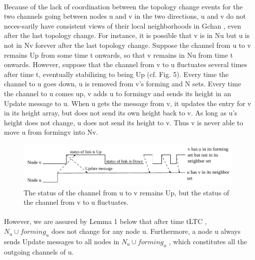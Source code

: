 \paragraph{}Because of the lack of coordination between the topology change events for the two channels going between nodes u and v in the two directions, u and v do not neces-sarily have consistent views of their local neighborhoods in Gchan , even after the last topology change. For instance, it is possible that v is in Nu but u is not in Nv forever after the last topology change. Suppose the channel from u to v remains Up from some time t onwards, so that v remains in Nu from time t onwards. However, suppose that the channel from v to u fluctuates several times after time t, eventually stabilizing to being Up (cf. Fig. 5). Every time the channel to u goes down, u is removed from v’s forming and N sets. Every time the channel to u comes up, v adds u to formingv and sends its height in an Update message to u. When u gets the message from v, it updates the entry for v in its height array, but does not send its own height back to v. As long as u’s height does not change, u does not send its height to v. Thus v is never able to move u from formingv into Nv.
\begin{figure}[h]
	\centering
	\includegraphics[width=1\linewidth]{fig_1}
	\caption[The status of the channel from u to v remains Up, but the status of the channel from v to u fluctuates.]{The status of the channel from u to v remains Up, but the status of the channel from v to u fluctuates.}
	\label{fig:fig1}
\end{figure}
\paragraph{}However, we are assured by Lemma 1 below that after time tLTC , $N_u \cup forming_u$ does not change for any node u. Furthermore, a node u always sends Update messages to all nodes in $N_u \cup forming_u$ , which constitutes all the outgoing channels of u.
